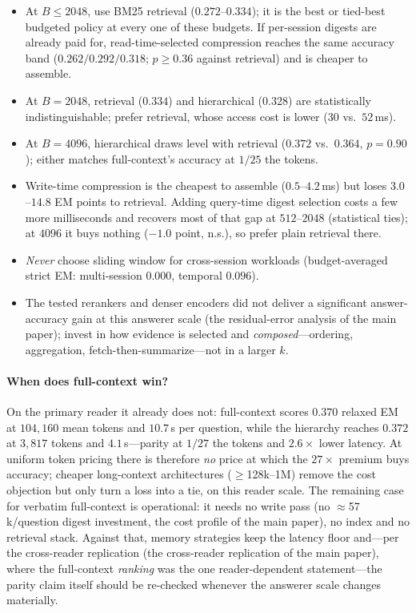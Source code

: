 \documentclass{article} %
\begin{document}
\begin{itemize}\setlength{\itemsep}{1pt}
\item[(i)] At $B \leq 2048$, use BM25 retrieval ($0.272$--$0.334$); it is the best or tied-best
budgeted policy at every one of these budgets. If per-session digests are already paid for,
read-time-selected compression reaches the same accuracy band ($0.262/0.292/0.318$;
$p\geq0.36$ against retrieval) and is cheaper to assemble.
\item[(ii)] At $B{=}2048$, retrieval ($0.334$) and hierarchical ($0.328$) are statistically
indistinguishable; prefer retrieval, whose access cost is lower ($30$ vs.\ $52$\,ms).
\item[(iii)] At $B{=}4096$, hierarchical draws level with retrieval ($0.372$ vs.\ $0.364$,
$p{=}0.90$); either matches full-context's accuracy at $1/25$ the tokens.
\item[(iv)] Write-time compression is the cheapest to assemble ($0.5$--$4.2$\,ms) but loses
$3.0$--$14.8$ EM points to retrieval. Adding query-time digest selection costs a few more
milliseconds and recovers most of that gap at $512$--$2048$ (statistical ties); at $4096$ it
buys nothing ($-1.0$ point, n.s.), so prefer plain retrieval there.
\item[(v)] \emph{Never} choose sliding window for cross-session workloads (budget-averaged
strict EM: multi-session $0.000$, temporal $0.096$).
\item[(vi)] The tested rerankers and denser encoders did not deliver a significant
answer-accuracy gain at this answerer scale (the residual-error analysis of the main paper); invest in how evidence is
selected and \emph{composed}---ordering, aggregation, fetch-then-summarize---not in a
larger $k$.
\end{itemize}

\paragraph{When does full-context win?} On the primary reader it already does not:
full-context scores $0.370$ relaxed EM at $104{,}160$ mean tokens and $10.7$\,s per
question, while the hierarchy reaches $0.372$ at $3{,}817$ tokens and $4.1$\,s---parity
at $1/27$ the tokens and $2.6\times$ lower latency. At uniform token pricing there is
therefore \emph{no} price at which the $27\times$ premium buys accuracy; cheaper
long-context architectures ($\geq$128k--1M) remove the cost objection but only turn a
loss into a tie, on this reader scale. The remaining case for verbatim full-context is
operational: it needs no write pass (no $\approx$57\,k/question digest investment,
the cost profile of the main paper), no index and no retrieval stack. Against that, memory strategies keep
the latency floor and---per the cross-reader replication (the cross-reader replication of the main paper), where the
full-context \emph{ranking} was the one reader-dependent statement---the parity claim
itself should be re-checked whenever the answerer scale changes materially.
\end{document}

